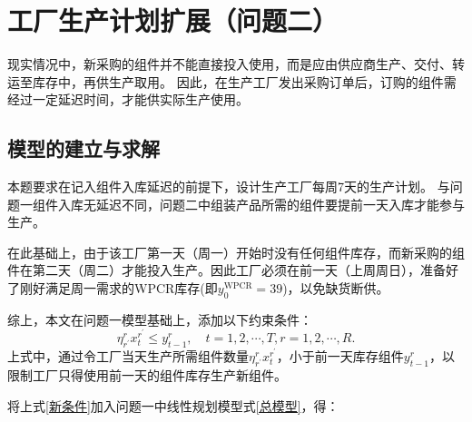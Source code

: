 \section{工厂生产计划扩展（问题二）} %
\label{sec:工厂生产计划扩展}

现实情况中，新采购的组件并不能直接投入使用，而是应由供应商生产、交付、转运至库存中，再供生产取用。
因此，在生产工厂发出采购订单后，订购的组件需经过一定延迟时间，才能供实际生产使用。

\subsection{模型的建立与求解} %
\label{sub:模型的建立与求解}


本题要求在记入组件入库延迟的前提下，设计生产工厂每周7天的生产计划。
与问题一组件入库无延迟不同，问题二中组装产品所需的组件要提前一天入库才能参与生产。

在此基础上，由于该工厂第一天（周一）开始时没有任何组件库存，而新采购的组件在第二天（周二）才能投入生产。因此工厂必须在前一天（上周周日），准备好了刚好满足周一需求的WPCR库存(即$y_0^{\text{WPCR}} = 39$)，以免缺货断供。

综上，本文在问题一模型基础上，添加以下约束条件：
\begin{equation}\label{新条件}
	\eta_{r^{\prime}}^{r} x_{t}^{r^{\prime}} \leqslant y_{t-1}^{r},\quad t=1,2, \cdots, T, r=1,2, \cdots, R.
\end{equation}
上式中，通过令工厂当天生产所需组件数量$\eta_{r^{\prime}}^{r} x_{t}^{r^{\prime}}$，小于前一天库存组件$y_{t-1}^{r}$，以限制工厂只得使用前一天的组件库存生产新组件。

将上式\ref{新条件}加入问题一中线性规划模型式\ref{总模型}，得：

